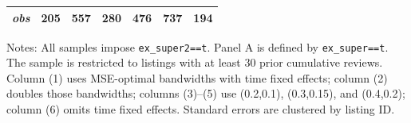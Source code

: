 \begin{table}[!htbp]
\begin{tabular}{lcccccc}
\textit{obs} & 205 & 557 & 280 & 476 & 737 & 194 \\
\bottomrule
\end{tabular}
\begin{minipage}{0.98\textwidth}\footnotesize
Notes: All samples impose \texttt{ex\_super2==t}. Panel A is defined by \texttt{ex\_super==t}. The sample is restricted to listings with at least 30 prior cumulative reviews. Column (1) uses MSE-optimal bandwidths with time fixed effects; column (2) doubles those bandwidths; columns (3)--(5) use (0.2,0.1), (0.3,0.15), and (0.4,0.2); column (6) omits time fixed effects. Standard errors are clustered by listing ID.
\end{minipage}
\end{table}
